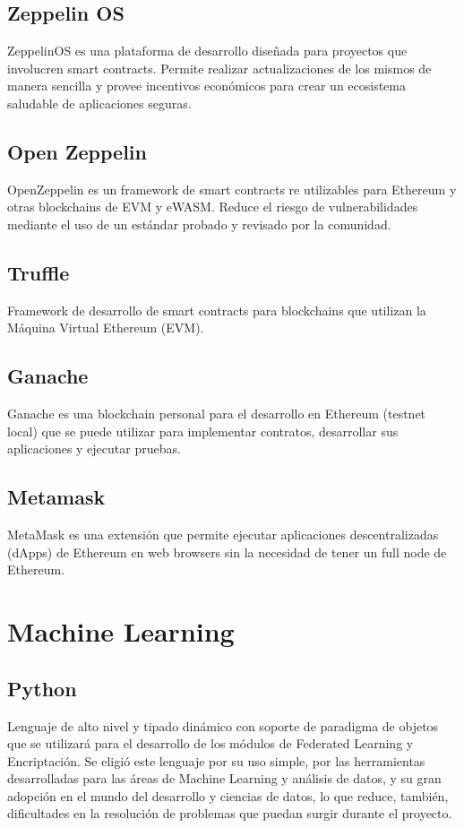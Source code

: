 \documentclass[
11pt, %
oneside, %
spanish, %
singlespacing, %
headsepline, %
chapterinoneline, %
]{MastersDoctoralThesis} %
\begin{document}
\subsection{Zeppelin OS \cite{zos}}
ZeppelinOS es una plataforma de desarrollo diseñada para proyectos que involucren smart contracts. Permite realizar actualizaciones de los mismos de manera sencilla y provee incentivos económicos para crear un ecosistema saludable de aplicaciones seguras.

\subsection{Open Zeppelin \cite{oz}}
OpenZeppelin es un framework de smart contracts re utilizables para Ethereum y otras blockchains de EVM y eWASM. Reduce el riesgo de vulnerabilidades mediante el uso de un estándar probado y revisado por la comunidad.

\subsection{Truffle \cite{tr}}
Framework de desarrollo de smart contracts para blockchains que utilizan la Máquina Virtual Ethereum (EVM).

\subsection{Ganache \cite{gch}}
Ganache es una blockchain personal para el desarrollo en Ethereum (testnet local) que se puede utilizar para implementar contratos, desarrollar sus aplicaciones y ejecutar pruebas.

\subsection{Metamask \cite{mk}}
MetaMask es una extensión que permite ejecutar aplicaciones descentralizadas (dApps) de Ethereum en web browsers sin la necesidad de tener un full node de Ethereum.

\section{Machine Learning}

\subsection{Python \cite{py}}
Lenguaje de alto nivel y tipado dinámico con soporte de paradigma de objetos que se utilizará para el desarrollo de los módulos de Federated Learning y Encriptación. Se eligió este lenguaje por su uso simple, por las herramientas desarrolladas para las áreas de Machine Learning y análisis de datos, y su gran adopción en el mundo del desarrollo y ciencias de datos, lo que reduce, también, dificultades en la resolución de problemas que puedan surgir durante el proyecto.
\end{document}
